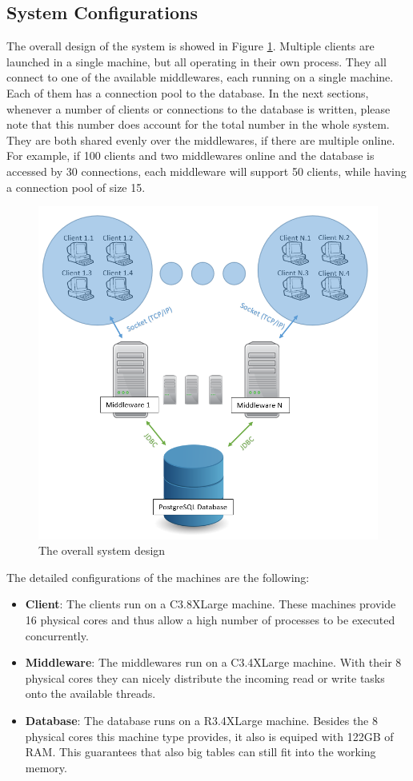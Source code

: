 \documentclass[11pt]{article}
\begin{document}
\subsection{System Configurations}\label{sec:system-configurations}
The overall design of the system is showed in Figure \ref{fig:overall_design}. Multiple clients are launched in a single machine, but all operating in their own process. They all connect to one of the available middlewares, each running on a single machine. Each of them has a connection pool to the database. In the next sections, whenever a number of clients or connections to the database is written, please note that this number does account for the total number in the whole system. They are both shared evenly over the middlewares, if there are multiple online. For example, if 100 clients and two middlewares online and the database is accessed by 30 connections, each middleware will support 50 clients, while having a connection pool of size 15.
\begin{figure}
\centering
\includegraphics[width=0.5\linewidth]{figures/overall_design}
\caption{The overall system design}
\label{fig:overall_design}
\end{figure}
The detailed configurations of the machines are the following:
\begin{itemize}
	\item \textbf{Client}: The clients run on a C3.8XLarge machine. These machines provide 16 physical cores and thus allow a high number of processes to be executed concurrently.
	\item \textbf{Middleware}: The middlewares run on a C3.4XLarge machine. With their 8 physical cores they can nicely distribute the incoming read or write tasks onto the available threads.
	\item \textbf{Database}: The database runs on a R3.4XLarge machine. Besides the 8 physical cores this machine type provides, it also is equiped with 122GB of RAM. This guarantees that also big tables can still fit into the working memory.
\end{itemize}
\end{document}
